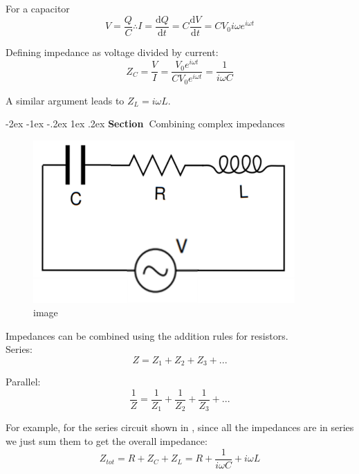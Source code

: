 \documentclass[
]{book}
\makeatletter
\renewcommand\section{%
\@startsection{section}{1}{\z@}%
              {-2ex \@plus -1ex \@minus -.2ex}%
              {1ex \@plus .2ex}%
              {\sffamily\bfseries\large\noindent Section~}}
\numberwithin{equation}{section}
\makeatother
\begin{document}
For a capacitor
\begin{equation}
\label{eq:foraCapacitor}
V = \frac{Q}{C} \therefore I = \frac{\mathrm{d} Q}{\mathrm{d} t} = C \frac{\mathrm{d} V}{\mathrm{d} t} = C V_0 i \omega e^{i\omega t}
\end{equation}

Defining impedance as voltage divided by current:
\begin{equation}
\label{eq:ZVI}
Z_C = \frac{V}{I} = \frac{V_0 e^{i\omega t} }{C V_0 e^{i\omega t}} = \frac{1}{i\omega C}
\end{equation}

A similar argument leads to \(Z_L = i\omega L\).

\hypertarget{combining-complex-impedances}{%
\section{Combining complex impedances}\label{combining-complex-impedances}}

\begin{figure}
\centering
\includegraphics[width=100mm,height=\textheight]{Figures/LCR_circuit.png}
\caption{image}
\end{figure}

Impedances can be combined using the addition rules for resistors.\\
Series:
\begin{equation}
\label{eq:ImpedanceSeries}
 Z = Z_1 + Z_2 + Z_3 + ...
\end{equation}

Parallel:
\begin{equation}
\label{eq:ImpParallel}
\frac{1}{Z} = \frac{1}{Z_1} + \frac{1}{Z_2} + \frac{1}{Z_3} + ...
\end{equation}

For example, for the series circuit shown in , since all the impedances
are in series we just sum them to get the overall impedance:
\begin{equation}
\label{eq:ImpOverall}
Z_{tot} = R + Z_C + Z_L = R + \frac{1}{i\omega C} + i\omega L
\end{equation}
\end{document}
